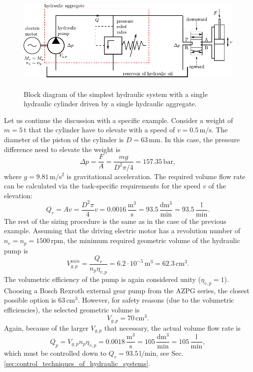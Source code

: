 \begin{figure}[ht!]
	\centering
		\includegraphics[height=5cm]{PositiveDisplacementPumps/Figures/Sizing_Of_System_With_Cylinder.pdf}
	\caption{Block diagram of the simplest hydraulic system with a single hydraulic cylinder driven by a single hydraulic aggregate.}
	\label{fig:hydraulic_aggregate_with_cylinder}
\end{figure}

Let us continue the discussion with a specific example. Consider a weight of $m=5\,\mathrm{t}$ that the cylinder have to elevate with a speed of $v=0.5\,\mathrm{m/s}$. The diameter of the piston of the cylinder is $D=63\,\mathrm{mm}$. In this case, the pressure difference need to elevate the weight is
%
\begin{equation}
\Delta p = \frac{F}{A} = \frac{mg}{D^2 \pi /4} = 157.35\,\mathrm{bar},
\end{equation}
%
where $g=9.81\,\mathrm{m/s^2}$ is gravitational acceleration. The required volume flow rate can be calculated via the task-specific requirements for the speed $v$ of the elevation:
%
\begin{equation}
Q_r = A v = \frac{D^2 \pi}{4} v = 0.0016\,\mathrm{\frac{m^3}{s}} = 93.5\,\mathrm{\frac{dm^3}{min}} = 93.5\,\mathrm{\frac{l}{min}}.
\end{equation}
%
The rest of the sizing procedure is the same as in the case of the previous example. Assuming that the driving electric motor has a revolution number of $n_e=n_p=1500\,\mathrm{rpm}$, the minimum required geometric volume of the hydraulic pump is
%
\begin{equation}
V_{g,p}^{min} = \frac{Q_r}{n_p \eta_{v,p}} = 6.2 \cdot 10^{-5}\,\mathrm{m^3} = 62.3\,\mathrm{cm^3}.
\end{equation}
%
The volumetric efficiency of the pump is again considered unity ($\eta_{v,p}=1$). Choosing a Bosch Rexroth external gear pump from the AZPG series, the closest possible option is $63\,\mathrm{cm^3}$. However, for safety reasons (due to the volumetric efficiencies), the selected geometric volume is
%
\begin{equation}
V_{g,p} = 70\,\mathrm{cm^3}.
\end{equation}
%
Again, because of the larger $V_{g,p}$ that necessary, the actual volume flow rate is
%
\begin{equation}
Q_p = V_{g,p} n_p \eta_{v,p} = 0.0018\,\mathrm{\frac{m^3}{s}} = 105\,\mathrm{\frac{dm^3}{min}} = 105\,\mathrm{\frac{l}{min}},
\end{equation}
%
which must be controlled down to $Q_r=93.5\,\mathrm{l/min}$, see Sec.\,\ref{sec:control_techniques_of_hydraulic_systems}.

